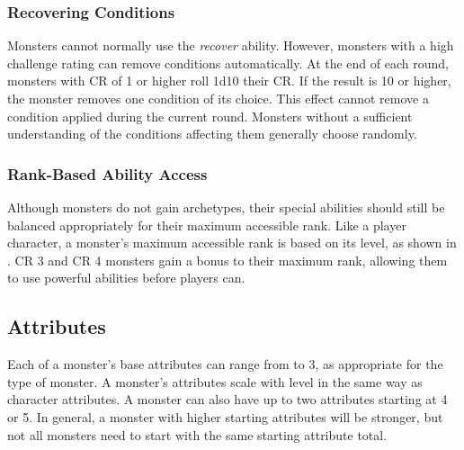         \subsubsection{Recovering Conditions}
            Monsters cannot normally use the \textit{recover} ability.
            However, monsters with a high challenge rating can remove conditions automatically.
            At the end of each round, monsters with CR of 1 or higher roll 1d10 \add their CR.
            If the result is 10 or higher, the monster removes one condition of its choice.
            This effect cannot remove a condition applied during the current round.
            Monsters without a sufficient understanding of the conditions affecting them generally choose randomly.

        \subsubsection{Rank-Based Ability Access}
            Although monsters do not gain archetypes, their special abilities should still be balanced appropriately for their maximum accessible rank.
            Like a player character, a monster's maximum accessible rank is based on its level, as shown in .
            CR 3 and CR 4 monsters gain a  bonus to their maximum rank, allowing them to use powerful abilities before players can.

    \subsection{Attributes}
        Each of a monster's base attributes can range from  to 3, as appropriate for the type of monster.
        A monster's attributes scale with level in the same way as character attributes.
        A monster can also have up to two attributes starting at 4 or 5.
        In general, a monster with higher starting attributes will be stronger, but not all monsters need to start with the same starting attribute total.

